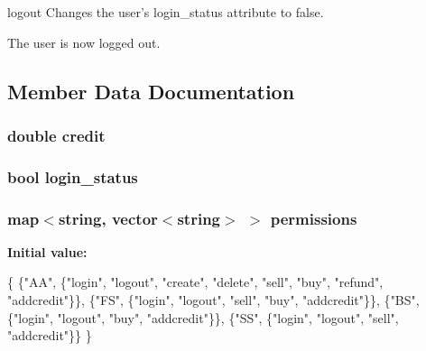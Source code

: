 logout Changes the user's login\-\_\-status attribute to false. 

The user is now logged out. 

\subsection{Member Data Documentation}
\hypertarget{class_user_aa559c3686bb9d38c3335c16bbea07be8}{
\subsubsection[{credit}]{\setlength{\rightskip}{0pt plus 5cm}double credit\hspace{0.3cm}{\ttfamily [private]}}}\label{class_user_aa559c3686bb9d38c3335c16bbea07be8}
\hypertarget{class_user_a31c707cfc594c5ea9c710f9a8986401b}{
\subsubsection[{login\-\_\-status}]{\setlength{\rightskip}{0pt plus 5cm}bool login\-\_\-status\hspace{0.3cm}{\ttfamily [private]}}}\label{class_user_a31c707cfc594c5ea9c710f9a8986401b}
\hypertarget{class_user_a57334f6c157620be2c10904a5025fc88}{
\subsubsection[{permissions}]{\setlength{\rightskip}{0pt plus 5cm}map$<$string, vector$<$string$>$ $>$ permissions\hspace{0.3cm}{\ttfamily [private]}}}\label{class_user_a57334f6c157620be2c10904a5025fc88}
{\bfseries Initial value\-:}
\begin{DoxyCode}
\{
        \{\textcolor{stringliteral}{"AA"}, \{\textcolor{stringliteral}{"login"}, \textcolor{stringliteral}{"logout"}, \textcolor{stringliteral}{"create"}, \textcolor{stringliteral}{"delete"}, \textcolor{stringliteral}{"sell"}, \textcolor{stringliteral}{"buy"}, \textcolor{stringliteral}{"refund"}, \textcolor{stringliteral}{"addcredit"}\}\},
        \{\textcolor{stringliteral}{"FS"}, \{\textcolor{stringliteral}{"login"}, \textcolor{stringliteral}{"logout"}, \textcolor{stringliteral}{"sell"}, \textcolor{stringliteral}{"buy"}, \textcolor{stringliteral}{"addcredit"}\}\},
        \{\textcolor{stringliteral}{"BS"}, \{\textcolor{stringliteral}{"login"}, \textcolor{stringliteral}{"logout"}, \textcolor{stringliteral}{"buy"}, \textcolor{stringliteral}{"addcredit"}\}\},
        \{\textcolor{stringliteral}{"SS"}, \{\textcolor{stringliteral}{"login"}, \textcolor{stringliteral}{"logout"}, \textcolor{stringliteral}{"sell"}, \textcolor{stringliteral}{"addcredit"}\}\}
    \}
\end{DoxyCode}


